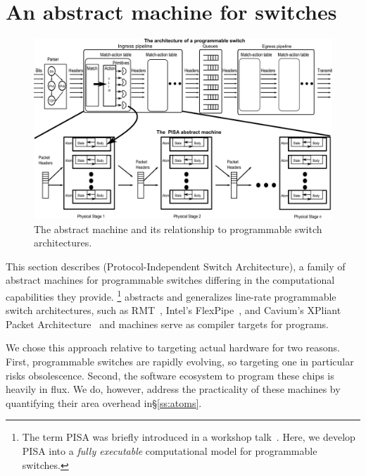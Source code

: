 \section{An abstract machine for switches}
\label{s:absmachine}

\begin{figure}[!t]
  \includegraphics[width=\textwidth]{pisa.pdf}
  \caption{The \absmachine abstract machine and its relationship to
  programmable switch architectures.}
  \label{fig:switch}
\end{figure}

This section describes \absmachine (Protocol-Independent Switch Architecture),
a family of abstract machines for programmable switches differing in the
computational capabilities they provide.  \footnote{The term PISA was briefly
  introduced in a workshop talk~\cite{nick_p4}.  Here, we develop PISA into a
\textit{fully executable} computational model for programmable switches.}
\absmachine abstracts and generalizes line-rate programmable switch
architectures, such as RMT~\cite{rmt}, Intel's FlexPipe~\cite{flexpipe}, and
Cavium's XPliant Packet Architecture~\cite{xpliant} and \absmachine machines
serve as compiler targets for \pktlanguage programs.

We chose this approach relative to targeting actual hardware for two reasons.
First, programmable switches are rapidly evolving, so targeting
one in particular risks obsolescence. Second, the software ecosystem to
program these chips is heavily in flux. We do, however, address the
practicality of these \absmachine machines by quantifying their area overhead
in\S\ref{ss:atoms}.

